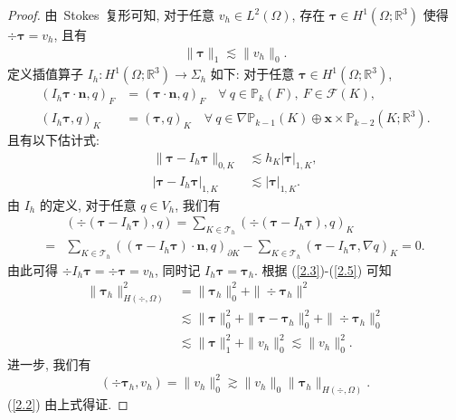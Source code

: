 	\begin{proof}
		由~Stokes~复形可知, 对于任意 $v_h\in L^2(\Omega)$, 存在 $\boldsymbol\tau\in H^1(\Omega;\mathbb{R}^3)$ 使得
		$\div\boldsymbol\tau=v_h$, 且有
		\begin{align}\label{2.3}
			\|\boldsymbol\tau\|_1\lesssim\|v_h\|_0.
		\end{align}
		定义插值算子 $I_h:H^1(\Omega;\mathbb{R}^3)\rightarrow\Sigma_h$ 如下: 对于任意 $\boldsymbol\tau\in H^1(\Omega;\mathbb{R}^3)$, 
		\begin{align*}
			(I_h\boldsymbol\tau\cdot\textbf{n}, q)_F&=(\boldsymbol\tau\cdot\textbf{n}, q)_F \quad \forall \ q\in\mathbb{P}_{k}(F), \ F\in\mathcal{F}(K),\\
			(I_h\boldsymbol\tau, q)_K&=(\boldsymbol\tau, q)_K \quad \forall \ q\in\nabla\mathbb{P}_{k-1}(K)\oplus \boldsymbol{x}\times\mathbb{P}_{k-2}(K;\mathbb{R}^3).
		\end{align*}
		且有以下估计式:
		\begin{align}
			\label{2.4}
			\|\boldsymbol\tau-I_h\boldsymbol\tau\|_{0,K}&\lesssim h_K|\boldsymbol\tau|_{1,K},\\
			\label{2.5}
			|\boldsymbol\tau-I_h\boldsymbol\tau|_{1,K}&\lesssim |\boldsymbol\tau|_{1,K}.
		\end{align}
		由 $I_h$ 的定义, 对于任意 $q\in V_h$, 我们有
		\begin{align*}
			&(\div(\boldsymbol\tau-I_h\boldsymbol\tau), q)=\sum_{K\in\mathcal{T}_h}(\div(\boldsymbol\tau-I_h\boldsymbol\tau), q)_K\\
			=&\sum_{K\in\mathcal{T}_h}((\boldsymbol\tau-I_h\boldsymbol\tau)\cdot\textbf{n}, q)_{\partial K}-\sum_{K\in\mathcal{T}_h}(\boldsymbol\tau-I_h\boldsymbol\tau, \nabla q)_K=0.
		\end{align*}
		由此可得 $\div I_h\boldsymbol\tau=\div\boldsymbol\tau=v_h$, 同时记 $I_h\boldsymbol\tau=\boldsymbol\tau_h$.
		根据 (\ref{2.3})-(\ref{2.5}) 可知
		\begin{align*}
			\|\boldsymbol\tau_h\|^2_{H(\div,\Omega)}&=\|\boldsymbol\tau_h\|^2_0+\|\div\boldsymbol\tau_h\|^2\\
			&\lesssim\|\boldsymbol\tau\|^2_0+\|\boldsymbol\tau-\boldsymbol\tau_h\|^2_0+\|\div\boldsymbol\tau_h\|^2_0\\
			&\lesssim\|\boldsymbol\tau\|^2_1+\|v_h\|^2_0\lesssim\|v_h\|^2_0.
		\end{align*}
		进一步, 我们有
		$$(\div\boldsymbol\tau_h, v_h)=\|v_h\|^2_0\gtrsim\|v_h\|_0\|\boldsymbol\tau_h\|_{H(\div,\Omega)}.$$
		(\ref{2.2}) 由上式得证.
	\end{proof}
	
